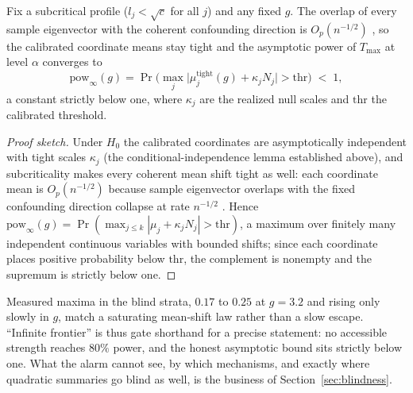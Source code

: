 \begin{proposition}
\label{prop:ceiling}
Fix a subcritical profile ($l_j<\sqrt c$ for all $j$) and any fixed $g$. The overlap of every sample eigenvector with the coherent confounding direction is $O_p(n^{-1/2})$ \citep{benaychgeorges2012singular}, so the calibrated coordinate means stay tight and the asymptotic power of $T_{\max}$ at level $\alpha$ converges to
\[
\mathrm{pow}_\infty(g)=\Pr\Big(\max_j\big|\mu_j^{\mathrm{tight}}(g)+\kappa_j N_j\big|>\mathrm{thr}\Big)\;<\;1,
\]
a constant strictly below one, where $\kappa_j$ are the realized null scales and $\mathrm{thr}$ the calibrated threshold.
\end{proposition}

\begin{proof}[Proof sketch]
Under $H_0$ the calibrated coordinates are asymptotically independent with tight scales $\kappa_j$ (the conditional-independence lemma established above), and subcriticality makes every coherent mean shift tight as well: each coordinate mean is $O_p(n^{-1/2})$ because sample eigenvector overlaps with the fixed confounding direction collapse at rate $n^{-1/2}$ \citep{benaychgeorges2012singular}. Hence $\mathrm{pow}_\infty(g)=\Pr(\max_{j\le k}|\mu_j+\kappa_j N_j|>\mathrm{thr})$, a maximum over finitely many independent continuous variables with bounded shifts; since each coordinate places positive probability below $\mathrm{thr}$, the complement is nonempty and the supremum is strictly below one.
\end{proof}

Measured maxima in the blind strata, $0.17$ to $0.25$ at $g=3.2$ and rising only slowly in $g$, match a saturating mean-shift law rather than a slow escape. ``Infinite frontier'' is thus gate shorthand for a precise statement: no accessible strength reaches $80\%$ power, and the honest asymptotic bound sits strictly below one. What the alarm cannot see, by which mechanisms, and exactly where quadratic summaries go blind as well, is the business of Section~\ref{sec:blindness}.
